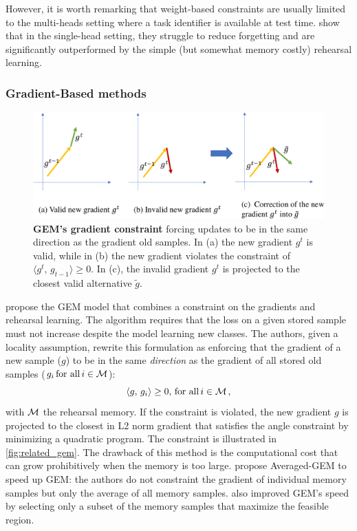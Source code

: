 However, it is worth remarking that weight-based constraints are usually limited to the multi-heads
setting where a task identifier is available at test time. \citet{lesort2019regulshortcomings} show
that in the single-head setting, they struggle to reduce forgetting and are significantly
outperformed by the simple (but somewhat memory costly) rehearsal learning.

\subsubsection{Gradient-Based methods}
\label{sec:related_regul_gradient}

\begin{figure}[tb]
      \begin{center}
            \includegraphics[width=1.0\linewidth]{images/related/gem.pdf}
      \end{center}
      \caption{\textbf{GEM's gradient constraint} forcing updates to be in the same direction as the
            gradient \wrt old samples. In (a) the new gradient $g^t$ is valid, while in (b) the new gradient
            violates the constraint of $\langle g^t,\, g_{t-1}\rangle \ge 0$. In (c), the invalid gradient
            $g^t$ is projected to the closest valid alternative $\tilde{g}$.}
      \label{fig:related_gem}
\end{figure}

\citet{lopezpaz2017gem} propose the GEM model that combines a constraint on the gradients and
rehearsal learning. The algorithm requires that the loss on a given stored sample must not increase
despite the model learning new classes. The authors, given a locality assumption, rewrite this
formulation as enforcing that the gradient of a new sample ($g$) to be in the same \textit{direction} as
the gradient of all stored old samples ($g_i \, \text{for all}\, i \in \mathcal{M}$):
%
\begin{equation}
      \langle g,\, g_i\rangle \ge 0,\, \text{for all}\, i \in \mathcal{M}\,,
\end{equation}
%
\noindent with $\mathcal{M}$ the rehearsal memory. If the constraint is violated, the new gradient $g$ is
projected to the closest in L2 norm gradient that satisfies the angle constraint by minimizing a
quadratic program. The constraint is illustrated in \autoref{fig:related_gem}. The drawback of this
method is the computational cost that can grow prohibitively when the memory is too large.
\citet{chaudhry2019AGEM} propose Averaged-GEM to speed up GEM: the authors do not constraint the
gradient of individual memory samples but only the average of all memory samples.
\citet{aljundi2019gradientselection} also improved GEM's speed by selecting only a subset of the
memory samples that maximize the feasible region.

